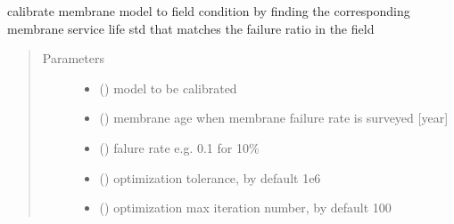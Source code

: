 \documentclass[letterpaper,10pt,english]{sphinxmanual}
\begin{document}

\begin{fulllineitems}
\label{\detokenize{membrane:membrane.calibrate_f}}
\sphinxAtStartPar
calibrate membrane model to field condition by finding the corresponding membrane service life std that matches the failure ratio in the field
\begin{quote}\begin{description}
\item[{Parameters}] \leavevmode\begin{itemize}
\item {} 
\sphinxAtStartPar
{} () \textendash{} model to be calibrated

\item {} 
\sphinxAtStartPar
{} (\sphinxstyleliteralemphasis{\sphinxupquote{, }}) \textendash{} membrane age when membrane failure rate is surveyed {[}year{]}

\item {} 
\sphinxAtStartPar
{} () \textendash{} falure rate e.g. 0.1 for 10\%

\item {} 
\sphinxAtStartPar
{} (\sphinxstyleliteralemphasis{\sphinxupquote{, }}) \textendash{} optimization tolerance, by default 1e\sphinxhyphen{}6

\item {} 
\sphinxAtStartPar
{} (\sphinxstyleliteralemphasis{\sphinxupquote{, }}) \textendash{} optimization max iteration number, by default 100


\end{itemize}
\end{description}
\end{quote}
\end{fulllineitems}
\end{document}
